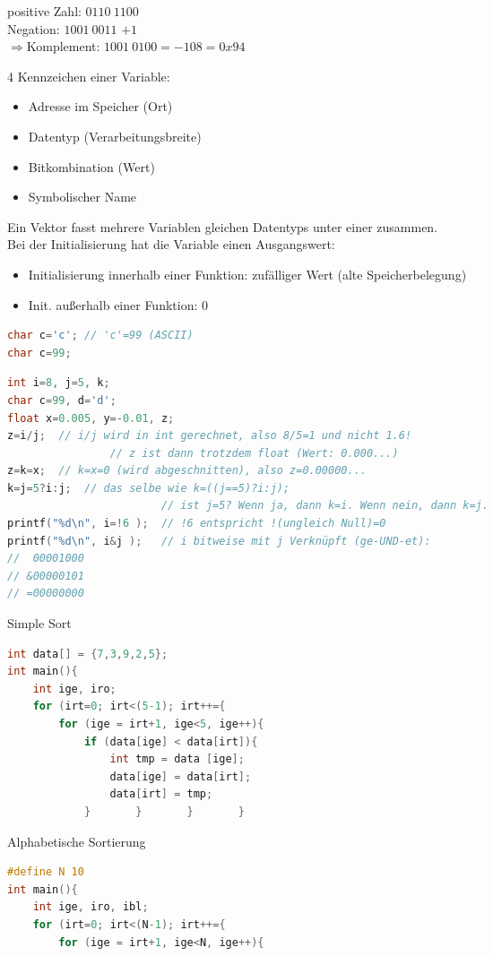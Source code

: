 \begin{multicols}{3}
positive Zahl: $0110 \: 1100$\\
Negation: $1001\: 0011$\; $+1$\\
$\Rightarrow$Komplement: $1001 \: 0100 = -108 = 0x94$

4 Kennzeichen einer Variable:
\begin{itemize}
\item Adresse im Speicher (Ort)
\item Datentyp (Verarbeitungsbreite)
\item Bitkombination (Wert)
\item Symbolischer Name
\end{itemize}
Ein Vektor fasst mehrere Variablen gleichen Datentyps unter einer zusammen.\smallskip\\
Bei der Initialisierung hat die Variable einen Ausgangswert:
\begin{itemize}
\item Initialisierung innerhalb einer Funktion: zufälliger Wert (alte Speicherbelegung)
\item Init. außerhalb einer Funktion: 0
\end{itemize}
\begin{lstlisting}[language=C]
char c='c';	// 'c'=99 (ASCII)
char c=99;
\end{lstlisting}
\begin{lstlisting}[language=C]
int i=8, j=5, k;
char c=99, d='d';
float x=0.005, y=-0.01, z;
z=i/j;	// i/j wird in int gerechnet, also 8/5=1 und nicht 1.6! 
				// z ist dann trotzdem float (Wert: 0.000...)
z=k=x;	// k=x=0 (wird abgeschnitten), also z=0.00000...
k=j=5?i:j;	// das selbe wie k=((j==5)?i:j);
						// ist j=5? Wenn ja, dann k=i. Wenn nein, dann k=j.
printf("%d\n", i=!6 );	// !6 entspricht !(ungleich Null)=0
printf("%d\n", i&j );	// i bitweise mit j Verknüpft (ge-UND-et):
//  00001000
// &00000101
// =00000000
\end{lstlisting}
\HRule[4pt]
Simple Sort
\begin{lstlisting}[language=C]
int data[] = {7,3,9,2,5};
int main(){
	int ige, iro;
	for (irt=0; irt<(5-1); irt++={
		for (ige = irt+1, ige<5, ige++){
			if (data[ige] < data[irt]){
				int tmp = data [ige];
				data[ige] = data[irt];
				data[irt] = tmp;
			}		}		}		}
\end{lstlisting}
Alphabetische Sortierung
\begin{lstlisting}[language=C]
#define N 10
int main(){
	int ige, iro, ibl;
	for (irt=0; irt<(N-1); irt++={
		for (ige = irt+1, ige<N, ige++){

\end{lstlisting}
\end{multicols}
